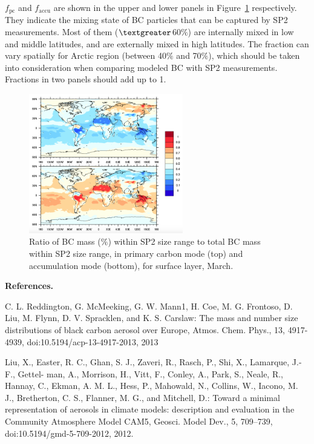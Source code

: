 \documentclass[11pt]{article}
\begin{document}
\noindent $f_{\text{pc}}$ and $f_{\text{accu}}$ are shown in the upper and lower panels in Figure~\ref{fig_P3} respectively. They indicate the mixing state of BC particles that can be captured by SP2 measurements. Most of them ($\textgreater$60$\%$) are internally mixed in low and middle latitudes, and are externally mixed in high latitudes. The fraction can vary spatially for Arctic region (between 40$\%$ and 70$\%$), which should be taken into consideration when comparing modeled BC with SP2 measurements. Fractions in two panels should add up to 1. 


\begin{figure}[!h] 
	\begin{center}
		\includegraphics[width = 0.6\textwidth]{Rplot03}
		\caption[]{\label{fig_P3} Ratio of BC mass ($\%$) within SP2 size range to total BC mass within SP2 size range, in primary carbon mode (top) and accumulation mode (bottom), for surface layer, March.}
	\end{center}
\end{figure}





\clearpage
\noindent \textbf{References. }

C. L. Reddington, G. McMeeking, G. W. Mann1, H. Coe, M. G. Frontoso, D. Liu, M. Flynn, D. V. Spracklen, and K. S. Carslaw: The mass and number size distributions of black carbon aerosol over Europe, Atmos. Chem. Phys., 13, 4917-4939, doi:10.5194/acp-13-4917-2013, 2013

Liu, X., Easter, R. C., Ghan, S. J., Zaveri, R., Rasch, P., Shi, X., Lamarque, J.-F., Gettel- man, A., Morrison, H., Vitt, F., Conley, A., Park, S., Neale, R., Hannay, C., Ekman, A. M. L., Hess, P., Mahowald, N., Collins, W., Iacono, M. J., Bretherton, C. S., Flanner, M. G., and Mitchell, D.: Toward a minimal representation of aerosols in climate models: description and evaluation in the Community Atmosphere Model CAM5, Geosci. Model Dev., 5, 709–739, doi:10.5194/gmd-5-709-2012, 2012.
\end{document}
